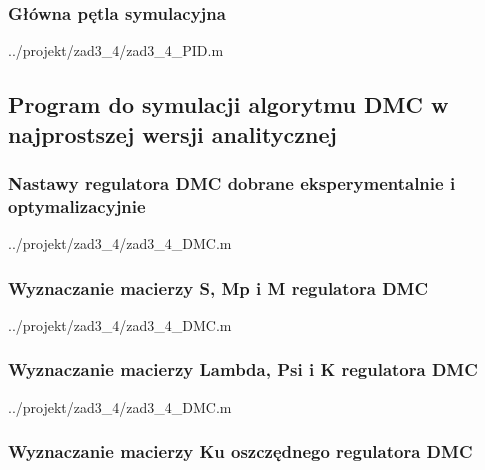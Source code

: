 \subsubsection{Główna pętla symulacyjna}

\ifdefined\CompileListings
    
        {../projekt/zad3_4/zad3_4_PID.m}
\fi
\newpage

\subsection{Program do symulacji algorytmu DMC w najprostszej wersji analitycznej}

\subsubsection{Nastawy regulatora DMC dobrane eksperymentalnie i optymalizacyjnie}

\ifdefined\CompileListings
    
        {../projekt/zad3_4/zad3_4_DMC.m}
\fi

\subsubsection{Wyznaczanie macierzy S, Mp i M regulatora DMC}

\ifdefined\CompileListings
    
        {../projekt/zad3_4/zad3_4_DMC.m}
    \newpage
\fi

\subsubsection{Wyznaczanie macierzy Lambda, Psi i K regulatora DMC}

\ifdefined\CompileListings
    
        {../projekt/zad3_4/zad3_4_DMC.m}
\fi

\subsubsection{Wyznaczanie macierzy Ku oszczędnego regulatora DMC}

